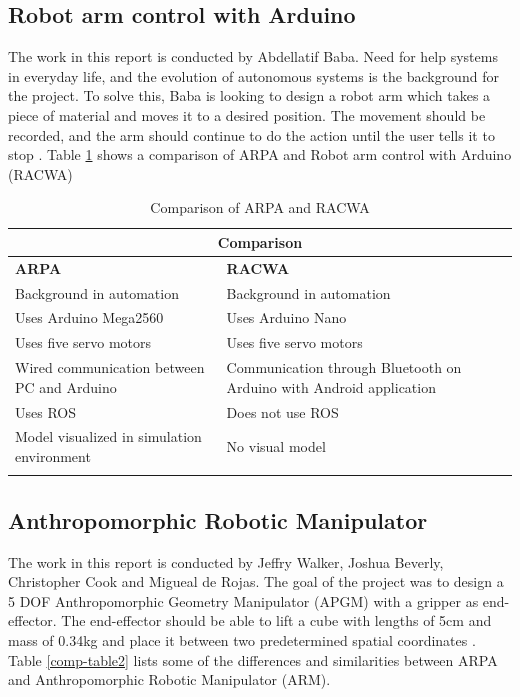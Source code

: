 \documentclass[11pt,a4paper, titlepage]{article}
\begin{document}
\subsection{Robot arm control with Arduino}
The work in this report is conducted by Abdellatif Baba. Need for help systems in everyday life, and the evolution of autonomous systems is the background for the project. To solve this, Baba is looking to design a robot arm which takes a piece of material and moves it to a desired position. The movement should be recorded, and the arm should continue to do the action until the user tells it to stop \cite{baba2017}. Table \ref{comp-table1} shows a comparison of ARPA and Robot arm control with Arduino (RACWA)

\begin{center}           
    \begin{longtable}{| p{8cm} | p{8cm} |}
              \hline
                       
\multicolumn{2}{|c|}{\textbf{Comparison}} \\ \hline \endhead
\textbf{ARPA} & \textbf{RACWA}  \\ \hline             
               Background in automation & Background in automation  \\ \hline
               Uses Arduino Mega2560 & Uses Arduino Nano  \\ \hline
               Uses five servo motors & Uses five servo motors \\ \hline
               Wired communication between PC and Arduino  & Communication through Bluetooth on Arduino with Android application \\ \hline
               Uses ROS & Does not use ROS \\ \hline
               Model visualized in simulation environment & No visual model \\ \hline
               
\caption{Comparison of ARPA and RACWA}
\label{comp-table1}                                       
\end{longtable}
\end{center}


\subsection{Anthropomorphic Robotic Manipulator}
The work in this report is conducted by Jeffry Walker, Joshua Beverly, Christopher Cook and Migueal de Rojas. The goal of the project was to design a 5 DOF Anthropomorphic Geometry Manipulator (APGM) with a gripper as end-effector. The end-effector should be able to lift a cube with lengths of 5cm and mass of 0.34kg and place it between two predetermined spatial coordinates \cite{walker2012}. Table \ref{comp-table2} lists some of the differences and similarities between ARPA and Anthropomorphic Robotic Manipulator (ARM).
\end{document}
